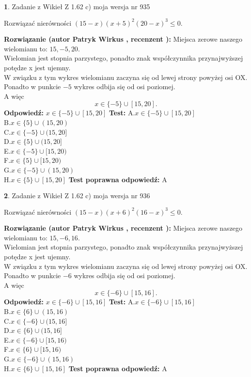 \documentclass[12pt, a4paper]{article}
\theoremstyle{definition} %
\newtheorem{zad}{}
\newcommand{\zadStart}[1]{\begin{zad}#1\newline}
\newcommand{\zadStop}{\end{zad}}
\newcommand{\rozwStart}[2]{\noindent \textbf{Rozwiązanie (autor #1 , recenzent #2): }\newline}
\newcommand{\rozwStop}{\newline}
\newcommand{\odpStart}{\noindent \textbf{Odpowiedź:}\newline}
\newcommand{\odpStop}{\newline}
\newcommand{\testStart}{\noindent \textbf{Test:}\newline}
\newcommand{\testStop}{\newline}
\newcommand{\kluczStart}{\noindent \textbf{Test poprawna odpowiedź:}\newline}
\newcommand{\kluczStop}{\newline}
\begin{document}
\zadStart{Zadanie z Wikieł Z 1.62 c) moja wersja nr 935}

Rozwiązać nierówności $(15-x)(x+5)^{2}(20-x)^{3}\le0$.
\zadStop
\rozwStart{Patryk Wirkus}{}
Miejsca zerowe naszego wielomianu to: $15, -5, 20$.\\
Wielomian jest stopnia parzystego, ponadto znak współczynnika przy\linebreak najwyższej potędze x jest ujemny.\\ W związku z tym wykres wielomianu zaczyna się od lewej strony powyżej osi OX.\\
Ponadto w punkcie $-5$ wykres odbija się od osi poziomej.\\
A więc $$x \in \{-5\} \cup [15,20].$$
\rozwStop
\odpStart
$x \in \{-5\} \cup [15,20]$
\odpStop
\testStart
A.$x \in \{-5\} \cup [15,20]$\\
B.$x \in \{5\} \cup (15,20)$\\
C.$x \in \{-5\} \cup (15,20]$\\
D.$x \in \{5\} \cup (15,20]$\\
E.$x \in \{-5\} \cup [15,20)$\\
F.$x \in \{5\} \cup [15,20)$\\
G.$x \in \{-5\} \cup (15,20)$\\
H.$x \in \{5\} \cup [15,20]$
\testStop
\kluczStart
A
\kluczStop



\zadStart{Zadanie z Wikieł Z 1.62 c) moja wersja nr 936}

Rozwiązać nierówności $(15-x)(x+6)^{2}(16-x)^{3}\le0$.
\zadStop
\rozwStart{Patryk Wirkus}{}
Miejsca zerowe naszego wielomianu to: $15, -6, 16$.\\
Wielomian jest stopnia parzystego, ponadto znak współczynnika przy\linebreak najwyższej potędze x jest ujemny.\\ W związku z tym wykres wielomianu zaczyna się od lewej strony powyżej osi OX.\\
Ponadto w punkcie $-6$ wykres odbija się od osi poziomej.\\
A więc $$x \in \{-6\} \cup [15,16].$$
\rozwStop
\odpStart
$x \in \{-6\} \cup [15,16]$
\odpStop
\testStart
A.$x \in \{-6\} \cup [15,16]$\\
B.$x \in \{6\} \cup (15,16)$\\
C.$x \in \{-6\} \cup (15,16]$\\
D.$x \in \{6\} \cup (15,16]$\\
E.$x \in \{-6\} \cup [15,16)$\\
F.$x \in \{6\} \cup [15,16)$\\
G.$x \in \{-6\} \cup (15,16)$\\
H.$x \in \{6\} \cup [15,16]$
\testStop
\kluczStart
A
\kluczStop
\end{document}
